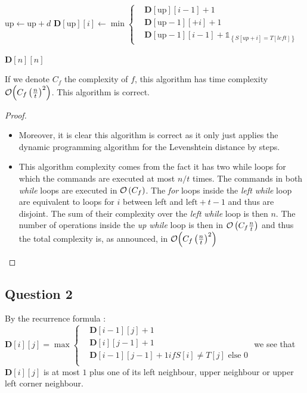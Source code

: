 \documentclass{cours}
\begin{document}
\begin{algorithm}
\begin{algorithmic}
                \EndFor
            \EndWhile
            \State $\text{up} \gets \text{up} + d$
                    \State $\mathbf{D}[\text{up}][i] \gets \min{\begin{cases}&\mathbf{D}[\text{up}][i - 1] + 1 \\ &\mathbf{D}[\text{up} - 1][ + i] + 1\\ &\mathbf{D}[\text{up} - 1][i - 1] + \mathds{1}_{\left\{S[up + i] = T[left]\right\}} \end{cases}}$ \\ 
                \EndFor
        \EndWhile\\

        \Return $\mathbf{D}[n][n]$
    
    \end{algorithmic}
\end{algorithm}
\begin{proposition}
    If we denote $C_{f}$ the complexity of $f$, this algorithm has time complexity $\mathcal{O}{\left(C_{f}\left(\frac{n}{t}\right)^{2}\right)}$. This algorithm is correct.
\end{proposition}
\begin{proof}
    \begin{itemize}
        \item Moreover, it is clear this algorithm is correct as it only just applies the dynamic programming algorithm for the Levenshtein distance by steps.
        \item This algorithm complexity comes from the fact it has two while loops for which the commands are executed at most $ n/t $ times. The commands in both \emph{while} loops are executed in $\mathcal{O}\left(C_{f}\right)$. The \emph{for} loops inside the \textit{left} \emph{while} loop are equivalent to loops for $i$ between left and $\text{left} + t - 1$ and thus are disjoint. The sum of their complexity over the \textit{left} \emph{while} loop is then $n$. The number of operations inside the \textit{up} \emph{while} loop is then in $\mathcal{O}\left(C_{f}\frac{n}{t}\right)$ and thus the total complexity is, as announced, in $\mathcal{O}{\left(C_{f}\left(\frac{n}{t}\right)^{2}\right)}$
    \end{itemize}
\end{proof}


\subsection{Question 2}
By the recurrence formula : $\mathbf{D}[i][j] = \max 
\begin{cases}
    &\mathbf{D}[i-1][j] + 1\\
    &\mathbf{D}[i][j-1] + 1\\
    &\mathbf{D}[i-1][j-1] + 1 if S[i] \neq T[j] \text{ else } 0\\
\end{cases}$
we see that $\mathbf{D}[i][j]$ is at most $1$ plus one of its left neighbour, upper neighbour or upper left corner neighbour.
\end{document}

